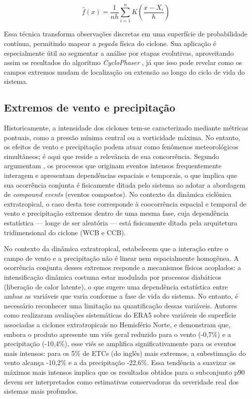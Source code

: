 \begin{equation}
\hat{f}(x) = \frac{1}{nh} \sum_{i=1}^{n} K\left(\frac{x - X_i}{h}\right)
\end{equation}

Essa técnica transforma observações discretas em uma superfície de probabilidade contínua, permitindo mapear a \textit{pegada} física do ciclone. Sua aplicação é especialmente útil ao segmentar a análise por etapas evolutivas, aproveitando assim os resultados do algoritmo \textit{CycloPhaser} \citep{coutodesouza2024new}, já que isso pode revelar como os campos extremos mudam de localização ou extensão ao longo do ciclo de vida do sistema.

\subsection{Extremos de vento e precipitação}\label{subsec:tb_compound_def}

Historicamente, a intensidade dos ciclones tem-se caracterizado mediante métricas pontuais, como a pressão mínima central ou a vorticidade máxima. 
No entanto, os efeitos de vento e precipitação podem atuar como fenômenos meteorológicos simultâneos; é aqui que reside a relevância de sua concorrência. 
Segundo argumentam \citet{zscheischler2018future}, os processos que originam eventos intensos frequentemente interagem e apresentam dependências espaciais e temporais, o que implica que sua ocorrência conjunta é fisicamente ditada pelo sistema ao adotar a abordagem de \textit{compound events} (eventos compostos). No contexto da dinâmica ciclônica extratropical, o caso desta tese corresponde à coocorrência espacial e temporal de vento e precipitação extremos dentro de uma mesma fase, cuja dependência estatística — longe de ser aleatória — está fisicamente ditada pela arquitetura tridimensional do ciclone (WCB e CCB).

No contexto da dinâmica extratropical, \citet{chen2025characteristics} estabelecem que a interação entre o campo de vento e a precipitação não é linear nem espacialmente homogênea. 
A ocorrência conjunta desses extremos responde a mecanismos físicos acoplados: a intensificação dinâmica costuma estar modulada por processos diabáticos (liberação de calor latente), o que sugere uma dependência estatística entre ambas as variáveis que varia conforme a fase de vida do sistema. 
No entanto, é necessário reconhecer uma limitação na quantificação dessas variáveis. 
Autores como \citet{chen2024evaluation} realizaram avaliações sistemáticas do ERA5 sobre variáveis de superfície associadas a ciclones extratropicais no Hemisfério Norte, e demonstram que, embora o produto apresente um viés geral reduzido para o vento (-0,7\%) e a precipitação (-10,4\%), esse viés se amplifica significativamente para os eventos mais intensos: para os 5\% de ETCs (do inglês) mais extremos, a subestimação do vento alcança -10,2\% e a da precipitação -22,6\%. 
Essa tendência a suavizar os máximos mais intensos implica que os resultados obtidos para o subconjunto p90 devem ser interpretados como estimativas conservadoras da severidade real dos sistemas mais profundos.

